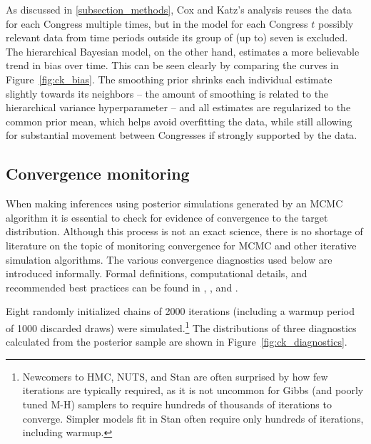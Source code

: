 As discussed in \ref{subsection_methods}, Cox and Katz's analysis reuses the data for each Congress multiple times, but in the model for each Congress $t$ possibly relevant data from time periods outside its group of (up to) seven is excluded. The hierarchical Bayesian model, on the other hand, estimates a more believable trend in bias over time. This can be seen clearly by comparing the curves in Figure~\ref{fig:ck_bias}. The smoothing prior shrinks each individual estimate slightly towards its neighbors -- the amount of smoothing is related to the hierarchical variance hyperparameter -- and all estimates are regularized to the common prior mean, which helps avoid overfitting the data, while still allowing for substantial movement between Congresses if strongly supported by the data.  

\subsection{Convergence monitoring}
\label{subsection_convergence}

When making inferences using posterior simulations generated by an MCMC algorithm it is essential to check for evidence of convergence to the target distribution. Although this process is not an exact science, there is no shortage of literature on the topic of monitoring convergence for MCMC and other iterative simulation algorithms. The various convergence diagnostics used below are introduced informally. Formal definitions, computational details, and recommended best practices can be found in , , and .

Eight randomly initialized chains of 2000 iterations (including a warmup period of 1000 discarded draws) were simulated.\footnote{Newcomers to HMC, NUTS, and Stan are often surprised by how few iterations are typically required, as it is not uncommon for Gibbs (and poorly tuned M-H) samplers to require hundreds of thousands of iterations to converge. Simpler models fit in Stan often require only hundreds of iterations, including warmup.} The distributions of three diagnostics calculated from the posterior sample are shown in Figure~\ref{fig:ck_diagnostics}. 

